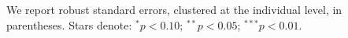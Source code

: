 \begin{table}[htb!]
\begin{threeparttable}
\begin{tablenotes}
{%
We report robust standard errors, clustered at the individual level, in parentheses. Stars denote: $^{*} p<0.10$; $^{**} p<0.05$; $^{***} p<0.01$.} \end{tablenotes} \end{threeparttable} \end{table}
